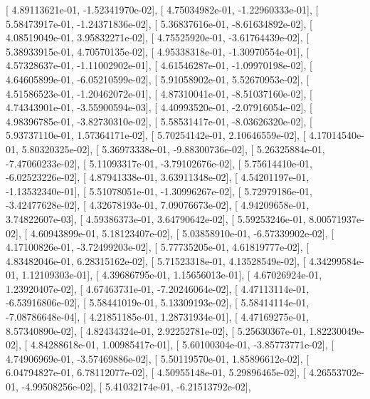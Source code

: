 \documentclass{article}
\begin{document}
       [  4.89113621e-01,  -1.52341970e-02],
       [  4.75034982e-01,  -1.22960333e-01],
       [  5.58473917e-01,  -1.24371836e-02],
       [  5.36837616e-01,  -8.61634892e-02],
       [  4.08519049e-01,   3.95832271e-02],
       [  4.75525920e-01,  -3.61764439e-02],
       [  5.38933915e-01,   4.70570135e-02],
       [  4.95338318e-01,  -1.30970554e-01],
       [  4.57328637e-01,  -1.11002902e-01],
       [  4.61546287e-01,  -1.09970198e-02],
       [  4.64605899e-01,  -6.05210599e-02],
       [  5.91058902e-01,   5.52670953e-02],
       [  4.51586523e-01,  -1.20462072e-01],
       [  4.87310041e-01,  -8.51037160e-02],
       [  4.74343901e-01,  -3.55900594e-03],
       [  4.40993520e-01,  -2.07916054e-02],
       [  4.98396785e-01,  -3.82730310e-02],
       [  5.58531417e-01,  -8.03626320e-02],
       [  5.93737110e-01,   1.57364171e-02],
       [  5.70254142e-01,   2.10646559e-02],
       [  4.17014540e-01,   5.80320325e-02],
       [  5.36973338e-01,  -9.88300736e-02],
       [  5.26325884e-01,  -7.47060233e-02],
       [  5.11093317e-01,  -3.79102676e-02],
       [  5.75614410e-01,  -6.02523226e-02],
       [  4.87941338e-01,   3.63911348e-02],
       [  4.54201197e-01,  -1.13532340e-01],
       [  5.51078051e-01,  -1.30996267e-02],
       [  5.72979186e-01,  -3.42477628e-02],
       [  4.32678193e-01,   7.09076673e-02],
       [  4.94209658e-01,   3.74822607e-03],
       [  4.59386373e-01,   3.64790642e-02],
       [  5.59253246e-01,   8.00571937e-02],
       [  4.60943899e-01,   5.18123407e-02],
       [  5.03858910e-01,  -6.57339902e-02],
       [  4.17100826e-01,  -3.72499203e-02],
       [  5.77735205e-01,   4.61819777e-02],
       [  4.83482046e-01,   6.28315162e-02],
       [  5.71523318e-01,   4.13528549e-02],
       [  4.34299584e-01,   1.12109303e-01],
       [  4.39686795e-01,   1.15656013e-01],
       [  4.67026924e-01,   1.23920407e-02],
       [  4.67463731e-01,  -7.20246064e-02],
       [  4.47113114e-01,  -6.53916806e-02],
       [  5.58441019e-01,   5.13309193e-02],
       [  5.58414114e-01,  -7.08786648e-04],
       [  4.21851185e-01,   1.28731934e-01],
       [  4.47169275e-01,   8.57340890e-02],
       [  4.82434324e-01,   2.92252781e-02],
       [  5.25630367e-01,   1.82230049e-02],
       [  4.84288618e-01,   1.00985417e-01],
       [  5.60100304e-01,  -3.85773771e-02],
       [  4.74906969e-01,  -3.57469886e-02],
       [  5.50119570e-01,   1.85896612e-02],
       [  6.04794827e-01,   6.78112077e-02],
       [  4.50955148e-01,   5.29896465e-02],
       [  4.26553702e-01,  -4.99508256e-02],
       [  5.41032174e-01,  -6.21513792e-02],
\end{document}
